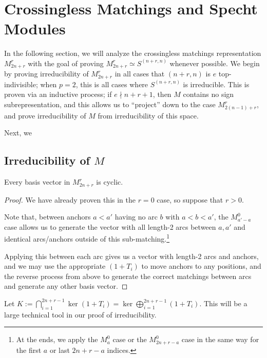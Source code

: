 \documentclass{amsart}
\begin{document}
\section{Crossingless Matchings and Specht Modules}\label{Crossingless Matchings Section}
In the following section, we will analyze the crossingless matchings representation $M_{2n + r}^r$ with the goal of proving $M_{2n + r}^r \simeq S^{(n+r,n)}$ whenever possible.
We begin by proving irreducibility of $M_{2n + r}^r$ in all cases that $(n+r,n)$ is $e$ top-indivisible;
when $p = 2$, this is all cases where $S^{(n+r,n)}$ is irreducible.
This is proven via an inductive process; if $e \nmid n + r + 1$, then $M$ contains no sign subrepresentation, and this allows us to ``project'' down to the case $M_{2(n-1) + r}^r$, and prove irreducibility of $M$ from irreducibility of this space.

Next, we 


\subsection{Irreducibility of $M$}
\begin{lemma}
  \label{Cyclic}
  Every basis vector in $M_{2n + r}^r$ is cyclic.
\end{lemma}
\begin{proof}
  We have already proven this in the $r = 0$ case, so suppose that $r > 0$.

    Note that, between anchors $a<a'$ having no arc $b$ with $a < b < a'$, the $M_{a'-a}^0$ case allows us to generate the vector with all length-2 arcs between $a,a'$ and identical arcs/anchors outside of this sub-matching.\footnote{At the ends, we apply the $M_a^0$ case or the $M_{2n + r - a}^{0}$ case in the same way for the first $a$ or last $2n + r - a$ indices.}

  Applying this between each arc gives us a vector with length-2 arcs and anchors, and we may use the appropriate $(1+T_i)$ to move anchors to any positions, and the reverse process from above to generate the correct matchings between arcs and generate any other basis vector.
\end{proof}

Let $K := \bigcap_{i=1}^{2n+r-1} \ker (1 + T_i) = \ker \bigoplus_{i = 1}^{2n + r - 1} (1 + T_i)$.
This will be a large technical tool in our proof of irreducibility.
\end{document}
